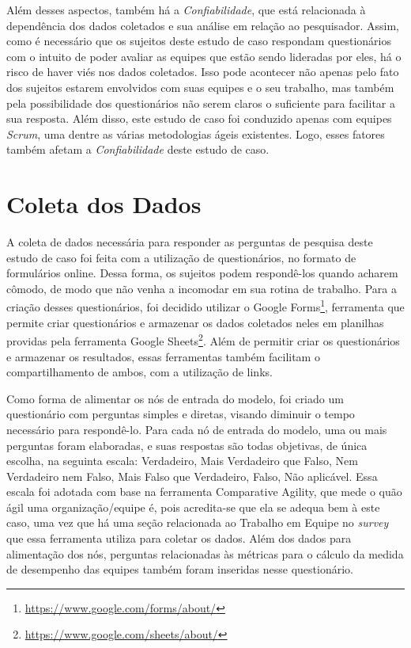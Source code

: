 Além desses aspectos, também há a \textit{Confiabilidade}, que está relacionada à dependência dos dados coletados e sua análise em relação ao pesquisador. Assim, como é necessário que os sujeitos deste estudo de caso respondam questionários com o intuito de poder avaliar as equipes que estão sendo lideradas por eles, há o risco de haver viés nos dados coletados. Isso pode acontecer não apenas pelo fato dos sujeitos estarem envolvidos com suas equipes e o seu trabalho, mas também pela possibilidade dos questionários não serem claros o suficiente para facilitar a sua resposta. Além disso, este estudo de caso foi conduzido apenas com equipes \textit{Scrum}, uma dentre as várias metodologias ágeis existentes. Logo, esses fatores também afetam a \textit{Confiabilidade} deste estudo de caso.

\section{Coleta dos Dados}
\label{estudodecaso:coleta}

A coleta de dados necessária para responder as perguntas de pesquisa deste estudo de caso foi feita com a utilização de questionários, no formato de formulários online. Dessa forma, os sujeitos podem respondê-los quando acharem cômodo, de modo que não venha a incomodar em sua rotina de trabalho. Para a criação desses questionários, foi decidido utilizar o Google Forms\footnote{\url{https://www.google.com/forms/about/}}, ferramenta que permite criar questionários e armazenar os dados coletados neles em planilhas providas pela ferramenta Google Sheets\footnote{\url{https://www.google.com/sheets/about/}}. Além de permitir criar os questionários e armazenar os resultados, essas ferramentas também facilitam o compartilhamento de ambos, com a utilização de links.

Como forma de alimentar os nós de entrada do modelo, foi criado um questionário com perguntas simples e diretas, visando diminuir o tempo necessário para respondê-lo. Para cada nó de entrada do modelo, uma ou mais perguntas foram elaboradas, e suas respostas são todas objetivas, de única escolha, na seguinta escala: Verdadeiro, Mais Verdadeiro que Falso, Nem Verdadeiro nem Falso, Mais Falso que Verdadeiro, Falso, Não aplicável. Essa escala foi adotada com base na ferramenta Comparative Agility, que mede o quão ágil uma organização/equipe é, pois acredita-se que ela se adequa bem à este caso, uma vez que há uma seção relacionada ao Trabalho em Equipe no \textit{survey} que essa ferramenta utiliza para coletar os dados. Além dos dados para alimentação dos nós, perguntas relacionadas às métricas para o cálculo da medida de desempenho das equipes também foram inseridas nesse questionário.

